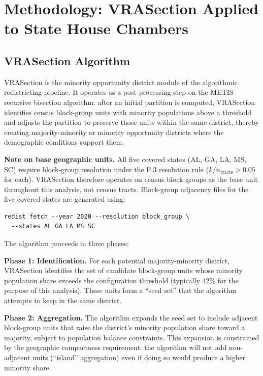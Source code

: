 \section{Methodology: VRASection Applied to State House Chambers}
\label{sec:methodology}

\subsection{VRASection Algorithm}

VRASection is the minority opportunity district module of the algorithmic redistricting pipeline. It operates as a post-processing step on the METIS recursive bisection algorithm: after an initial partition is computed, VRASection identifies census block-group units with minority populations above a threshold and adjusts the partition to preserve those units within the same district, thereby creating majority-minority or minority opportunity districts where the demographic conditions support them.

\textbf{Note on base geographic units.} All five covered states (AL, GA, LA, MS, SC) require block-group resolution under the F.3 resolution rule ($k/n_{\mathrm{tracts}} > 0.05$ for each). VRASection therefore operates on census block groups as the base unit throughout this analysis, not census tracts. Block-group adjacency files for the five covered states are generated using:
\begin{verbatim}
redist fetch --year 2020 --resolution block_group \
  --states AL GA LA MS SC
\end{verbatim}

The algorithm proceeds in three phases:

\textbf{Phase 1: Identification.} For each potential majority-minority district, VRASection identifies the set of candidate block-group units whose minority population share exceeds the configuration threshold (typically 42\% for the purpose of this analysis). These units form a ``seed set'' that the algorithm attempts to keep in the same district.

\textbf{Phase 2: Aggregation.} The algorithm expands the seed set to include adjacent block-group units that raise the district's minority population share toward a majority, subject to population balance constraints. This expansion is constrained by the geographic compactness requirement: the algorithm will not add non-adjacent units (``island'' aggregation) even if doing so would produce a higher minority share.

